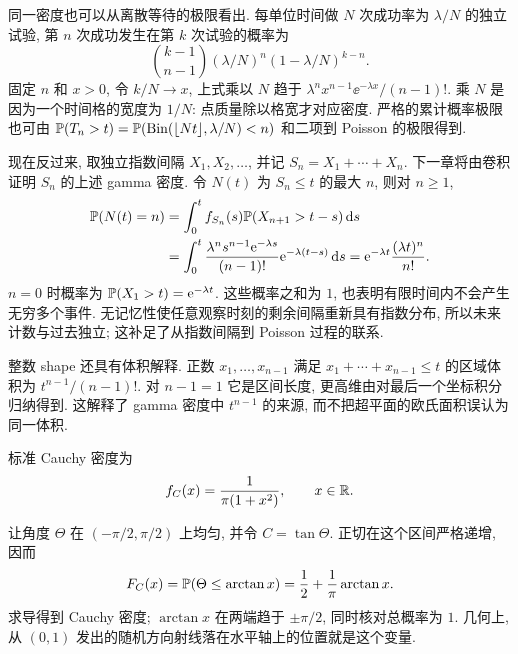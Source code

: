 同一密度也可以从离散等待的极限看出. 每单位时间做 $N$ 次成功率为 $\lambda/N$ 的独立试验, 第 $n$ 次成功发生在第 $k$ 次试验的概率为
\[
 \binom{k-1}{n-1}(\lambda/N)^n(1-\lambda/N)^{k-n}.
\]
固定 $n$ 和 $x>0$, 令 $k/N\to x$, 上式乘以 $N$ 趋于
$\lambda^n x^{n-1}\ee^{-\lambda x}/(n-1)!$. 乘 $N$ 是因为一个时间格的宽度为 $1/N$: 点质量除以格宽才对应密度. 严格的累计概率极限也可由
$\mathbb P(T_n>t)=\mathbb P(\operatorname{Bin}(\lfloor Nt\rfloor,\lambda/N)<n)$ 和二项到 Poisson 的极限得到.

现在反过来, 取独立指数间隔 $X_1,X_2,\ldots$, 并记 $S_n=X_1+\cdots+X_n$. 下一章将由卷积证明 $S_n$ 的上述 gamma 密度. 令 $N(t)$ 为 $S_n\le t$ 的最大 $n$, 则对 $n\ge1$,
\begin{align*}
 \mathbb P(N(t)=n)
 &=\int_0^t f_{S_n}(s)\mathbb P(X_{n+1}>t-s)\,\mathrm d s\\
 &=\int_0^t\frac{\lambda^n s^{n-1}\mathrm e^{-\lambda s}}{(n-1)!}
                 \mathrm e^{-\lambda(t-s)}\,\mathrm d s
 =\mathrm e^{-\lambda t}\frac{(\lambda t)^n}{n!}.
\end{align*}
$n=0$ 时概率为 $\mathbb P(X_1>t)=\mathrm e^{-\lambda t}$. 这些概率之和为 $1$, 也表明有限时间内不会产生无穷多个事件. 无记忆性使任意观察时刻的剩余间隔重新具有指数分布, 所以未来计数与过去独立; 这补足了从指数间隔到 Poisson 过程的联系.

整数 shape 还具有体积解释. 正数 $x_1,\ldots,x_{n-1}$ 满足 $x_1+\cdots+x_{n-1}\le t$ 的区域体积为 $t^{n-1}/(n-1)!$. 对 $n-1=1$ 它是区间长度, 更高维由对最后一个坐标积分归纳得到. 这解释了 gamma 密度中 $t^{n-1}$ 的来源, 而不把超平面的欧氏面积误认为同一体积.


\begin{definition}[标准 Cauchy 分布]
标准 Cauchy 密度为
\[
 f_C(x)=\frac1{\pi(1+x^2)},\qquad x\in\mathbb R.
\]
\end{definition}

让角度 $\Theta$ 在 $(-\pi/2,\pi/2)$ 上均匀, 并令 $C=\tan\Theta$. 正切在这个区间严格递增, 因而
\[
 F_C(x)=\mathbb P(\Theta\le\arctan x)
 =\frac12+\frac1\pi\arctan x.
\]
求导得到 Cauchy 密度; $\arctan x$ 在两端趋于 $\pm\pi/2$, 同时核对总概率为 $1$. 几何上, 从 $(0,1)$ 发出的随机方向射线落在水平轴上的位置就是这个变量.

\begin{center}
\end{center}

